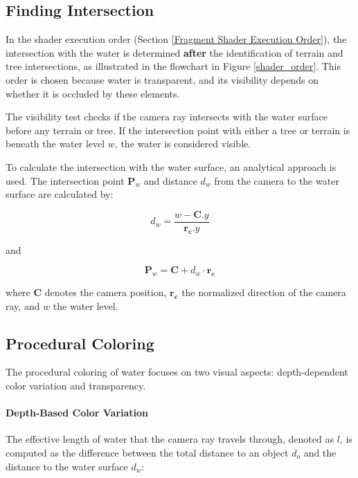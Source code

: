 \subsection{Finding Intersection}

In the shader execution order (Section \ref{Fragment Shader Execution Order}), the intersection with the water is determined \textbf{after} the identification of terrain and tree intersections, as illustrated in the flowchart in Figure \ref{shader_order}. This order is chosen because water is transparent, and its visibility depends on whether it is occluded by these elements.

The visibility test checks if the camera ray intersects with the water surface before any terrain or tree. If the intersection point with either a tree or terrain is beneath the water level $w$, the water is considered visible.

To calculate the intersection with the water surface, an analytical approach is used. The intersection point $\mathbf{P}_w$ and distance $d_w$ from the camera to the water surface are calculated by:

\begin{equation}
d_{w} = \frac{w - \mathbf{C}.y}{\mathbf{r_c}.y}
\end{equation}

and

\begin{equation}
\mathbf{P}_{w} = \mathbf{C} + d_{w}\cdot\mathbf{r_c}
\end{equation}

where $\mathbf{C}$ denotes the camera position, $\mathbf{r_c}$ the normalized direction of the camera ray, and $w$ the water level.

\subsection{Procedural Coloring}
\label{Water Procedural Coloring}

The procedural coloring of water focuses on two visual aspects: depth-dependent color variation and transparency. 

\paragraph{Depth-Based Color Variation}
   
The effective length of water that the camera ray travels through, denoted as $l$, is computed as the difference between the total distance to an object $d_{o}$ and the distance to the water surface $d_{w}$:

